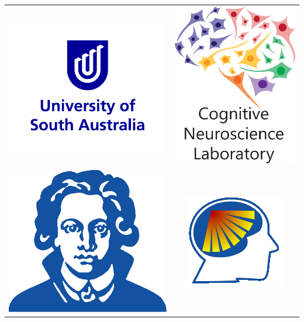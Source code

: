 \documentclass[final]{beamer}
\begin{document}
\begin{frame}{}
\begin{textblock}{18}
\begin{block}{}
\begin{tabular}{c c }
\includegraphics[width=.55\linewidth]{logo_unisa_RGB-blue.png} &   \includegraphics[width=.3\linewidth]{cnl-color.eps}  \\
\includegraphics[width=.4\linewidth]{logo_frankfurt_square.png} & \includegraphics[width=.4\linewidth]{logo_fiebach_lab.png} \\
\end{tabular}

\vspace{0.4cm}

\end{block}


\end{textblock}

\end{frame}
\end{document}
